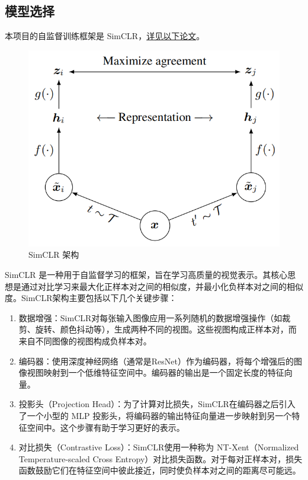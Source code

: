 \documentclass[notitlepage,cs4size,punct,oneside]{ctexrep}
\numberwithin{equation}{chapter}
\theoremstyle{mystyle}
\begin{document}
\subsection{模型选择}
本项目的自监督训练框架是 SimCLR，\href{http://proceedings.mlr.press/v119/chen20j/chen20j.pdf}{详见以下论文}。
\begin{figure}[H]
    \centering
    \includegraphics[scale=0.6]{simclr.png}
    \caption{SimCLR 架构}
\end{figure}
SimCLR 是一种用于自监督学习的框架，旨在学习高质量的视觉表示。其核心思想是通过对比学习来最大化正样本对之间的相似度，并最小化负样本对之间的相似度。SimCLR架构主要包括以下几个关键步骤：
\begin{enumerate}
\item 数据增强：SimCLR对每张输入图像应用一系列随机的数据增强操作（如裁剪、旋转、颜色抖动等），生成两种不同的视图。这些视图构成正样本对，而来自不同图像的视图构成负样本对。

\item 编码器：使用深度神经网络（通常是ResNet）作为编码器，将每个增强后的图像视图映射到一个低维特征空间中。编码器的输出是一个固定长度的特征向量。

\item 投影头（Projection Head）：为了计算对比损失，SimCLR在编码器之后引入了一个小型的 MLP 投影头，将编码器的输出特征向量进一步映射到另一个特征空间中。这个步骤有助于学习更好的表示。

\item 对比损失（Contrastive Loss）：SimCLR使用一种称为 NT-Xent（Normalized Temperature-scaled Cross Entropy）对比损失函数。对于每对正样本对，损失函数鼓励它们在特征空间中彼此接近，同时使负样本对之间的距离尽可能远。
\end{enumerate}
\end{document}
